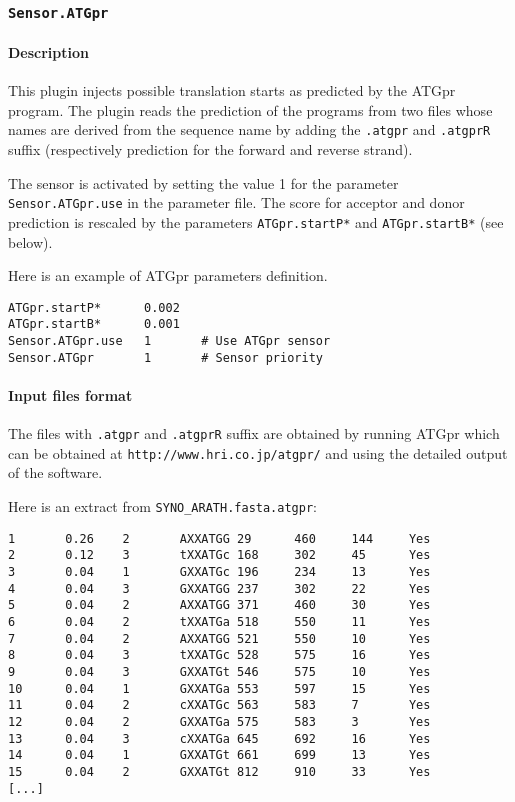 
\subsubsection{\texttt{Sensor.ATGpr}}

\paragraph{Description}

This plugin injects possible translation starts as predicted by the
ATGpr program. The plugin reads the prediction of the
programs from two files whose names are derived from the sequence name
by adding the \texttt{.atgpr} and \texttt{.atgprR} suffix
(respectively prediction for the forward and reverse strand).

The sensor is activated by setting the value 1 for the parameter
\texttt{Sensor.ATGpr.use} in the parameter file. The score for acceptor
and donor prediction is rescaled by the parameters {\tt ATGpr.startP*} and
{\tt ATGpr.startB*} (see below).

Here is an example of ATGpr parameters definition.
\begin{Verbatim}[fontsize=\small]
ATGpr.startP*      0.002
ATGpr.startB*      0.001
Sensor.ATGpr.use   1       # Use ATGpr sensor
Sensor.ATGpr       1       # Sensor priority
\end{Verbatim}

\paragraph{Input files format}

The files with \texttt{.atgpr} and \texttt{.atgprR} suffix are
obtained by running ATGpr which can be obtained at
\texttt{http://www.hri.co.jp/atgpr/} and using the
detailed output of the software.

Here is an extract from \texttt{SYNO\_ARATH.fasta.atgpr}:
\begin{Verbatim}[fontsize=\small]
1       0.26    2       AXXATGG 29      460     144     Yes     
2       0.12    3       tXXATGc 168     302     45      Yes     
3       0.04    1       GXXATGc 196     234     13      Yes     
4       0.04    3       GXXATGG 237     302     22      Yes     
5       0.04    2       AXXATGG 371     460     30      Yes     
6       0.04    2       tXXATGa 518     550     11      Yes     
7       0.04    2       AXXATGG 521     550     10      Yes     
8       0.04    3       tXXATGc 528     575     16      Yes     
9       0.04    3       GXXATGt 546     575     10      Yes     
10      0.04    1       GXXATGa 553     597     15      Yes     
11      0.04    2       cXXATGc 563     583     7       Yes     
12      0.04    2       GXXATGa 575     583     3       Yes     
13      0.04    3       cXXATGa 645     692     16      Yes     
14      0.04    1       GXXATGt 661     699     13      Yes     
15      0.04    2       GXXATGt 812     910     33      Yes     
[...]
\end{Verbatim}

